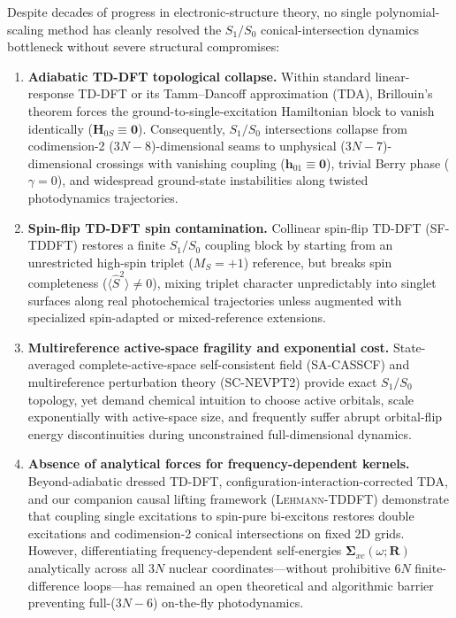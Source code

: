 \documentclass[10pt,twocolumn]{article}
\theoremstyle{natthm}
\newcommand{\Sig}{\mathbf{\Sigma}_{xc}}
\newcommand{\Ssq}{\langle\hat{S}^2\rangle}
\begin{document}
Despite decades of progress in electronic-structure theory, no single polynomial-scaling method has cleanly resolved the $S_1/S_0$ conical-intersection dynamics bottleneck without severe structural compromises\cite{levine2006,maitra2016,maitra2022}:
\begin{enumerate}
  \setlength{\itemsep}{1pt}
  \item \textbf{Adiabatic TD-DFT topological collapse.} Within standard linear-response TD-DFT or its Tamm--Dancoff approximation (TDA)\cite{casida1995,hirata1999,furche2002}, Brillouin's theorem forces the ground-to-single-excitation Hamiltonian block to vanish identically ($\mathbf{H}_{0S}\equiv\mathbf{0}$). Consequently, $S_1/S_0$ intersections collapse from codimension-2 ($3N{-}8$)-dimensional seams to unphysical ($3N{-}7$)-dimensional crossings with vanishing coupling ($\mathbf{h}_{01}\equiv\mathbf{0}$), trivial Berry phase ($\gamma=0$), and widespread ground-state instabilities along twisted photodynamics trajectories\cite{levine2006,tapavicza2008}.
  \item \textbf{Spin-flip TD-DFT spin contamination.} Collinear spin-flip TD-DFT (SF-TDDFT)\cite{shao2003sftddft,minezawa2009sfci} restores a finite $S_1/S_0$ coupling block by starting from an unrestricted high-spin triplet ($M_S=+1$) reference, but breaks spin completeness ($\Ssq\ne 0$), mixing triplet character unpredictably into singlet surfaces along real photochemical trajectories unless augmented with specialized spin-adapted or mixed-reference extensions\cite{zhang2015sfsa,lee2018mrsf}.
  \item \textbf{Multireference active-space fragility and exponential cost.} State-averaged complete-active-space self-consistent field (SA-CASSCF) and multireference perturbation theory (SC-NEVPT2)\cite{angeli2001nevpt2} provide exact $S_1/S_0$ topology, yet demand chemical intuition to choose active orbitals, scale exponentially with active-space size, and frequently suffer abrupt orbital-flip energy discontinuities during unconstrained full-dimensional dynamics\cite{bennun2000ethylene,curchod2018namd}.
  \item \textbf{Absence of analytical forces for frequency-dependent kernels.} Beyond-adiabatic dressed TD-DFT\cite{maitra2004,maitra2022}, configuration-interaction-corrected TDA\cite{li2014nacv,shu2017df,teh2019cistd}, and our companion causal lifting framework (\textsc{Lehmann-TDDFT}\cite{zeng2026lehmanntddft}) demonstrate that coupling single excitations to spin-pure bi-excitons restores double excitations and codimension-2 conical intersections on fixed 2D grids. However, differentiating frequency-dependent self-energies $\Sig(\omega;\mathbf{R})$ analytically across all $3N$ nuclear coordinates---without prohibitive $6N$ finite-difference loops---has remained an open theoretical and algorithmic barrier preventing full-($3N{-}6$) on-the-fly photodynamics.
\end{enumerate}
\end{document}
